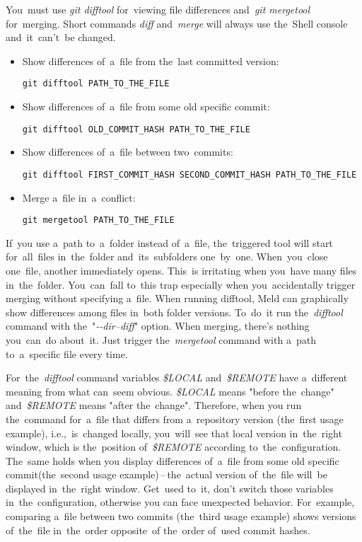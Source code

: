 You~must use \textit{git difftool} for~viewing file differences and~\textit{git mergetool} for~merging. Short commands \textit{diff} and~\textit{merge} will always use the~Shell console and~it~can't~be changed.

\begin{itemize}
    \item Show differences of~a~file from the~last committed version:
        \begin{lstlisting}[frame=no, gobble=12]
            git difftool PATH_TO_THE_FILE
        \end{lstlisting}
    \item Show differences of~a~file from some old specific commit:
        \begin{lstlisting}[frame=no, gobble=12]
            git difftool OLD_COMMIT_HASH PATH_TO_THE_FILE
        \end{lstlisting}
    \item Show differences of~a~file between two~commits:
        \begin{lstlisting}[frame=no, gobble=12]
            git difftool FIRST_COMMIT_HASH SECOND_COMMIT_HASH PATH_TO_THE_FILE
        \end{lstlisting}
    \item Merge a~file in~a~conflict:
        \begin{lstlisting}[frame=no, gobble=12]
            git mergetool PATH_TO_THE_FILE
        \end{lstlisting}
\end{itemize}

\warningnonl If~you use a~path to~a~folder instead of~a~file, the~triggered tool will start for~all~files in~the~folder and~its~subfolders one~by~one. When~you~close one~file, another immediately opens. This~is irritating when you~have many files in~the~folder. You~can~fall to~this trap especially when you~accidentally trigger merging without specifying a~file. When running difftool, Meld can graphically show differences among files in~both folder versions. To~do~it run the~\textit{difftool} command with the~\mbox{"\textit{-{}-dir--diff}"} option. When merging, there's nothing you~can~do about~it. Just trigger the~\textit{mergetool} command with a~path to~a~specific file every time.

\warning For~the~\textit{difftool} command variables \textit{\$LOCAL} and~\textit{\$REMOTE} have a~different meaning from what can~seem obvious. \textit{\$LOCAL} means "before the~change" and~\textit{\$REMOTE} means "after the~change". Therefore, when you run the~command for~a~file that differs from a~repository version (the~first usage example), i.e.,~is~changed locally, you~will~see that local version in~the~right window, which is the~position of~\textit{\$REMOTE} according to~the~configuration. The~same holds when you display differences of~a~file from some old specific commit(the~second usage example)\,--\,the~actual version of~the~file will~be displayed in~the~right window. Get~used to~it, don't switch those variables in~the~configuration, otherwise you can face unexpected behavior. For~example, comparing a~file between two commits (the~third usage example) shows versions of~the~file in~the~order opposite~of the~order of~used commit hashes.

